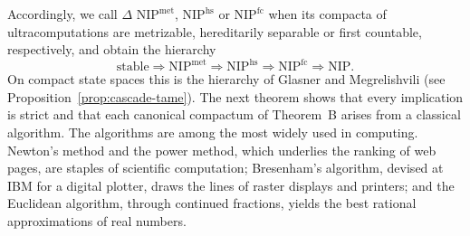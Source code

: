 \documentclass[psamsfonts]{amsart}
\theoremstyle{definition}
\theoremstyle{remark}
\newcommand{\NIP}{\text{NIP}}
\numberwithin{equation}{section}
\begin{document}
Accordingly, we call $\Delta$ $\NIP^{\mathrm{met}}$, $\NIP^{\mathrm{hs}}$ or $\NIP^{\mathrm{fc}}$ when its compacta of ultracomputations are metrizable, hereditarily separable or first countable, respectively, and obtain the hierarchy
\[
\text{stable}\Rightarrow\NIP^{\mathrm{met}}\Rightarrow\NIP^{\mathrm{hs}}\Rightarrow\NIP^{\mathrm{fc}}\Rightarrow\NIP .
\]
On compact state spaces this is the hierarchy of Glasner and Megrelishvili (see Proposition~\ref{prop:cascade-tame}).
The next theorem shows that every implication is strict and that each canonical compactum of Theorem~B arises from a classical algorithm.
The algorithms are among the most widely used in computing.
Newton's method and the power method, which underlies the ranking of web pages, are staples of scientific computation; Bresenham's algorithm, devised at IBM for a digital plotter, draws the lines of raster displays and printers; and the Euclidean algorithm, through continued fractions, yields the best rational approximations of real numbers.
\end{document}
